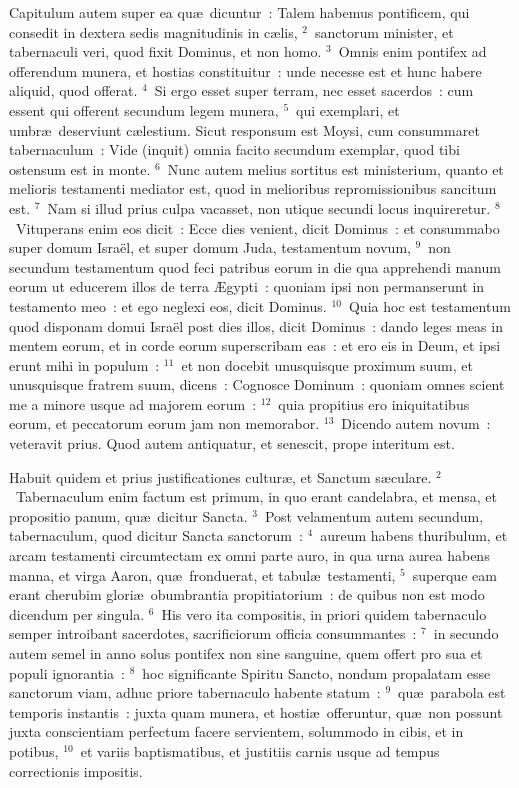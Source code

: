 \bchapter
\lettrine[lines=3,image=true,loversize=0.05,lraise=-0.03]{C}{}apitulum autem super ea qu\ae\ dicuntur~: Talem habemus pontificem, qui consedit in dextera sedis magnitudinis in c\ae lis,
${}^{2}$~sanctorum minister, et tabernaculi veri, quod fixit Dominus, et non homo.
${}^{3}$~Omnis enim pontifex ad offerendum munera, et hostias constituitur~: unde necesse est et hunc habere aliquid, quod offerat.
${}^{4}$~Si ergo esset super terram, nec esset sacerdos~: cum essent qui offerent secundum legem munera,
${}^{5}$~qui exemplari, et umbr\ae\ deserviunt c\ae lestium. Sicut responsum est Moysi, cum consummaret tabernaculum~: Vide (inquit) omnia facito secundum exemplar, quod tibi ostensum est in monte.
${}^{6}$~Nunc autem melius sortitus est ministerium, quanto et melioris testamenti mediator est, quod in melioribus repromissionibus sancitum est.
${}^{7}$~Nam si illud prius culpa vacasset, non utique secundi locus inquireretur.
${}^{8}$~Vituperans enim eos dicit~: Ecce dies venient, dicit Dominus~: et consummabo super domum Isra\"el, et super domum Juda, testamentum novum,
${}^{9}$~non secundum testamentum quod feci patribus eorum in die qua apprehendi manum eorum ut educerem illos de terra \AE gypti~: quoniam ipsi non permanserunt in testamento meo~: et ego neglexi eos, dicit Dominus.
${}^{10}$~Quia hoc est testamentum quod disponam domui Isra\"el post dies illos, dicit Dominus~: dando leges meas in mentem eorum, et in corde eorum superscribam eas~: et ero eis in Deum, et ipsi erunt mihi in populum~:
${}^{11}$~et non docebit unusquisque proximum suum, et unusquisque fratrem suum, dicens~: Cognosce Dominum~: quoniam omnes scient me a minore usque ad majorem eorum~:
${}^{12}$~quia propitius ero iniquitatibus eorum, et peccatorum eorum jam non memorabor.
${}^{13}$~Dicendo autem novum~: veteravit prius. Quod autem antiquatur, et senescit, prope interitum est.

\bchapter
\lettrine[lines=3,image=true,loversize=0.05,lraise=-0.03]{H}{}abuit quidem et prius justificationes cultur\ae , et Sanctum s\ae culare.
${}^{2}$~Tabernaculum enim factum est primum, in quo erant candelabra, et mensa, et propositio panum, qu\ae\ dicitur Sancta.
${}^{3}$~Post velamentum autem secundum, tabernaculum, quod dicitur Sancta sanctorum~:
${}^{4}$~aureum habens thuribulum, et arcam testamenti circumtectam ex omni parte auro, in qua urna aurea habens manna, et virga Aaron, qu\ae\ fronduerat, et tabul\ae\ testamenti,
${}^{5}$~superque eam erant cherubim glori\ae\ obumbrantia propitiatorium~: de quibus non est modo dicendum per singula.
${}^{6}$~His vero ita compositis, in priori quidem tabernaculo semper introibant sacerdotes, sacrificiorum officia consummantes~:
${}^{7}$~in secundo autem semel in anno solus pontifex non sine sanguine, quem offert pro sua et populi ignorantia~:
${}^{8}$~hoc significante Spiritu Sancto, nondum propalatam esse sanctorum viam, adhuc priore tabernaculo habente statum~:
${}^{9}$~qu\ae\ parabola est temporis instantis~: juxta quam munera, et hosti\ae\ offeruntur, qu\ae\ non possunt juxta conscientiam perfectum facere servientem, solummodo in cibis, et in potibus,
${}^{10}$~et variis baptismatibus, et justitiis carnis usque ad tempus correctionis impositis.


